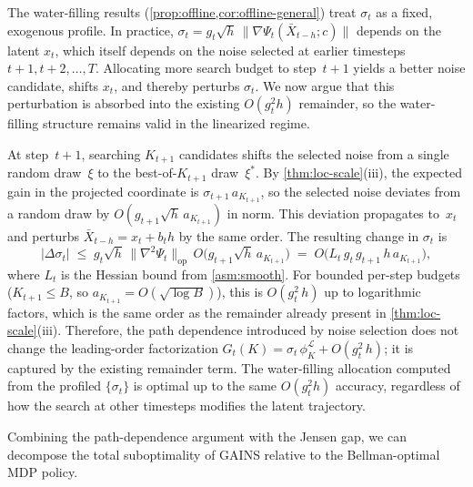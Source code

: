 \begin{remark}
\label{rmk:path-dependence}
The water-filling results (\cref{prop:offline,cor:offline-general})
treat $\sigma_t$ as a fixed, exogenous profile.
In practice, $\sigma_t=g_t\sqrt{h}\,\|\nabla\Psi_t(\bar{X}_{t-h};c)\|$
depends on the latent $x_t$, which itself depends on the noise
selected at earlier timesteps $t+1,t+2,\ldots,T$.
Allocating more search budget to step~$t+1$ yields a better noise
candidate, shifts $x_t$, and thereby perturbs $\sigma_t$.
We now argue that this perturbation is absorbed into the existing
$O(g_t^2 h)$ remainder, so the water-filling structure remains valid
in the linearized regime.

At step~$t+1$, searching $K_{t+1}$ candidates shifts the selected
noise from a single random draw~$\xi$ to the best-of-$K_{t+1}$
draw~$\xi^*$.
By \cref{thm:loc-scale}(iii), the expected gain in the projected
coordinate is $\sigma_{t+1}\,a_{K_{t+1}}$, so the selected noise
deviates from a random draw by $O(g_{t+1}\sqrt{h}\,a_{K_{t+1}})$ in
norm.
This deviation propagates to~$x_t$ and perturbs
$\bar{X}_{t-h}=x_t+b_t h$ by the same order.
The resulting change in $\sigma_t$ is
\[
  |\Delta\sigma_t|
  \;\le\;
  g_t\sqrt{h}\,\|\nabla^2\Psi_t\|_{\mathrm{op}}\,
  O\bigl(g_{t+1}\sqrt{h}\,a_{K_{t+1}}\bigr)
  \;=\;
  O\bigl(L_t\,g_t\,g_{t+1}\,h\,a_{K_{t+1}}\bigr),
\]
where $L_t$ is the Hessian bound from \cref{asm:smooth}.
For bounded per-step budgets ($K_{t+1}\le B$, so
$a_{K_{t+1}}=O(\sqrt{\log B})$), this is $O(g_t^2\,h)$ up to
logarithmic factors, which is the same order as the remainder already
present in \cref{thm:loc-scale}(iii).
Therefore, the path dependence introduced by noise selection does not
change the leading-order factorization
$G_t(K)=\sigma_t\,\phi_K^{\mathcal{L}}+O(g_t^2\,h)$; it is
captured by the existing remainder term.
The water-filling allocation computed from the profiled
$\{\sigma_t\}$ is optimal up to the same $O(g_t^2 h)$ accuracy,
regardless of how the search at other timesteps modifies the
latent trajectory.
\end{remark}

Combining the path-dependence argument with the Jensen gap, we can
decompose the total suboptimality of GAINS relative to the
Bellman-optimal MDP policy.

